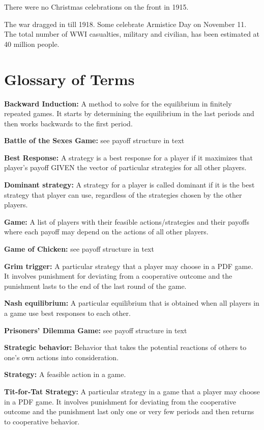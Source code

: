 \documentclass[
]{book}
\begin{document}
There were no Christmas celebrations on the front in 1915.

The war dragged in till 1918. Some celebrate Armistice Day on November 11. The total number of WWI casualties, military and civilian, has been estimated at 40 million people.

\hypertarget{glossary-of-terms-7}{%
\section{Glossary of Terms}\label{glossary-of-terms-7}}

\textbf{Backward Induction:} A method to solve for the equilibrium in finitely repeated games. It starts by determining the equilibrium in the last periods and then works backwards to the first period.

\textbf{Battle of the Sexes Game:} see payoff structure in text

\textbf{Best Response:} A strategy is a best response for a player if it maximizes that player's payoff GIVEN the vector of particular strategies for all other players.

\textbf{Dominant strategy:} A strategy for a player is called dominant if it is the best strategy that player can use, regardless of the strategies chosen by the other players.

\textbf{Game:} A list of players with their feasible actions/strategies and their payoffs where each payoff may depend on the actions of all other players.

\textbf{Game of Chicken:} see payoff structure in text

\textbf{Grim trigger:} A particular strategy that a player may choose in a PDF game. It involves punishment for deviating from a cooperative outcome and the punishment lasts to the end of the last round of the game.

\textbf{Nash equilibrium:} A particular equilibrium that is obtained when all players in a game use best responses to each other.

\textbf{Prisoners' Dilemma Game:} see payoff structure in text

\textbf{Strategic behavior:} Behavior that takes the potential reactions of others to one's own actions into consideration.

\textbf{Strategy:} A feasible action in a game.

\textbf{Tit-for-Tat Strategy:} A particular strategy in a game that a player may choose in a PDF game. It involves punishment for deviating from the cooperative outcome and the punishment last only one or very few periods and then returns to cooperative behavior.
\end{document}
